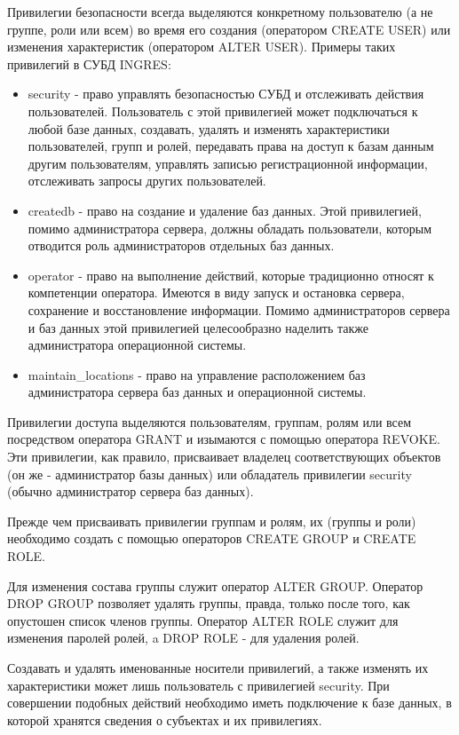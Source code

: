 Привилегии безопасности всегда выделяются конкретному
пользователю (а не группе, роли или всем) во время его создания (оператором
CREATE USER) или изменения характеристик (оператором ALTER USER). Примеры
таких привилегий в СУБД INGRES:
\begin{itemize}
    \item security - право управлять безопасностью СУБД и отслеживать действия
пользователей. Пользователь с этой привилегией может подключаться к любой базе
данных, создавать, удалять и изменять характеристики пользователей, групп и ролей,
передавать права на доступ к базам данным другим пользователям, управлять
записью регистрационной информации, отслеживать запросы других пользователей.
    \item createdb - право на создание и удаление баз данных. Этой привилегией,
помимо администратора сервера, должны обладать пользователи, которым отводится
роль администраторов отдельных баз данных.
    \item operator - право на выполнение действий, которые традиционно относят к
компетенции оператора. Имеются в виду запуск и остановка сервера, сохранение и
восстановление информации. Помимо администраторов сервера и баз данных этой
привилегией целесообразно наделить также администратора операционной системы.
    \item maintain\_locations - право на управление расположением баз администратора
сервера баз данных и операционной системы.
\end{itemize}

Привилегии доступа выделяются пользователям, группам, ролям или всем посредством оператора GRANT и изымаются с помощью оператора REVOKE. Эти привилегии, как правило, присваивает владелец соответствующих объектов (он же - администратор базы данных) или обладатель привилегии security (обычно администратор сервера баз данных).

Прежде чем присваивать привилегии группам и ролям, их (группы и роли) необходимо создать с помощью операторов CREATE GROUP и CREATE ROLE.

Для изменения состава группы служит оператор ALTER GROUP. Оператор DROP GROUP позволяет удалять группы, правда, только после того, как опустошен список членов группы. Оператор ALTER ROLE служит для изменения паролей ролей, a DROP ROLE - для удаления ролей.

Создавать и удалять именованные носители привилегий, а также изменять их характеристики может лишь пользователь с привилегией security. При совершении подобных действий необходимо иметь подключение к базе данных, в которой хранятся сведения о субъектах и их привилегиях.
